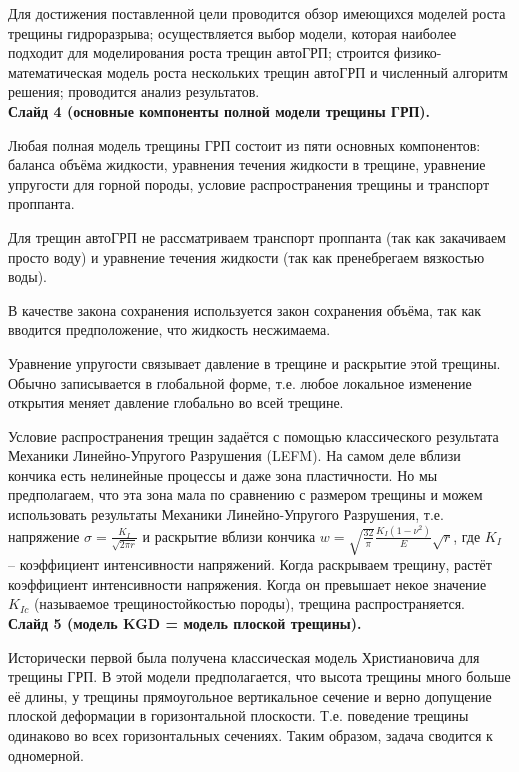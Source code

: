 \documentclass[a4paper, 12pt]{article}
\begin{document}
Для достижения поставленной цели проводится обзор имеющихся моделей роста трещины гидроразрыва;
осуществляется выбор модели, которая наиболее подходит для моделирования роста трещин автоГРП;
строится физико-математическая модель роста нескольких трещин автоГРП и численный алгоритм решения;
проводится анализ результатов.\\

\textbf{Слайд 4 (основные компоненты полной модели трещины ГРП).}

Любая полная модель трещины ГРП состоит из пяти основных компонентов: баланса объёма жидкости, уравнения течения жидкости в трещине, уравнение упругости для горной породы, условие распространения трещины и транспорт проппанта.

Для трещин автоГРП не рассматриваем транспорт проппанта (так как закачиваем просто воду) и уравнение течения жидкости (так как пренебрегаем вязкостью воды).

В качестве закона сохранения используется закон сохранения объёма, так как вводится предположение, что жидкость несжимаема.

Уравнение упругости связывает давление в трещине и раскрытие этой трещины.
Обычно записывается в глобальной форме, т.е. любое локальное изменение открытия меняет давление глобально во всей трещине.

Условие распространения трещин задаётся с помощью классического результата Механики Линейно-Упругого Разрушения (LEFM).
На самом деле вблизи кончика есть нелинейные процессы и даже зона пластичности.
Но мы предполагаем, что эта зона мала по сравнению с размером трещины и можем использовать результаты Механики Линейно-Упругого Разрушения, т.е. напряжение $\sigma=\frac{K_I}{\sqrt{2\pi r}}$ и раскрытие вблизи кончика $w=\sqrt{\frac{32}{\pi}}\frac{K_{I}\left(1-\nu^2\right)}{E}\sqrt{r}$, где $K_I$ -- коэффициент интенсивности напряжений.
Когда раскрываем трещину, растёт коэффициент интенсивности напряжения.
Когда он превышает некое значение $K_{Ic}$ (называемое трещиностойкостью породы), трещина распространяется.\\

\textbf{Слайд 5 (модель KGD = модель плоской трещины).}

Исторически первой была получена классическая модель Христиановича для трещины ГРП.
В этой модели предполагается, что высота трещины много больше её длины, у трещины прямоугольное вертикальное сечение и верно допущение плоской деформации в горизонтальной плоскости.
Т.е. поведение трещины одинаково во всех горизонтальных сечениях.
Таким образом, задача сводится к одномерной.
\end{document}
